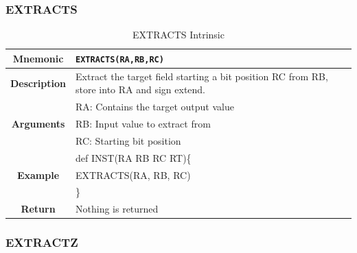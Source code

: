 \documentclass{article}
\begin{document}
\clearpage
\subsubsection{EXTRACTS}
\label{sec:EXTRACTS}

\begin{table}[h]
\begin{center}
\caption{EXTRACTS Intrinsic}
\vspace{0.125in}
\label{tab:EXTRACTSIntrinsic}
\begin{tabular}{|c|l|}
\hline
\textbf{Mnemonic} & \texttt{EXTRACTS(RA,RB,RC)}\\
\hline
\textbf{Description} & Extract the target field starting a bit position RC from RB, store into RA and sign extend.\\
\hline
\multirow{3}{*}{\textbf{Arguments}} & RA: Contains the target output value\\
                          			     & RB: Input value to extract from \\
			                              & RC: Starting bit position\\
\hline
\multirow{3}{*}{\textbf{Example}} & def INST(RA RB RC RT)\{\\
                          			  &   EXTRACTS(RA, RB, RC)\\
                                                    & \}\\
\hline
\textbf{Return} & Nothing is returned\\                                                    
\hline
\end{tabular}
\end{center}
\end{table}

\clearpage
\subsubsection{EXTRACTZ}
\label{sec:EXTRACTZ}
\end{document}
